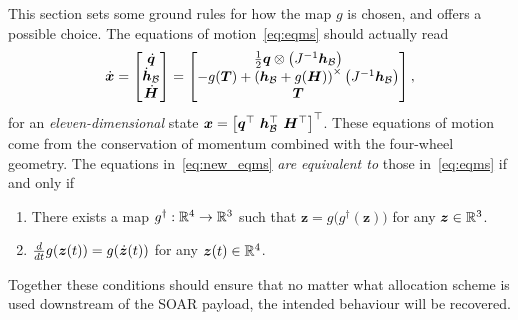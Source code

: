 \documentclass[10pt]{article}
\begin{document}
This section sets some ground rules for how the map $g$ is chosen, and offers a possible choice. The equations of motion~\eqref{eq:eqms} should actually read 
\begin{equation}
\dot{\bm{x}} = \begin{bmatrix}
\dot{\bm{q}} \\ \dot{\bm{h}}_{\mathcal{B}} \\ \dot{\bm{H}}
\end{bmatrix} = \begin{bmatrix}
\tfrac{1}{2} \bm{q} \otimes \left(J^{-1} \bm{h}_{\mathcal{B}} \right) \\
-g(\bm{T}) + \left( \bm{h}_{\mathcal{B}} + g(\bm{H}) \right)^{\times} \left( J^{-1} \bm{h}_{\mathcal{B}} \right) \\
\bm{T}
\end{bmatrix},
\label{eq:new_eqms}
\end{equation}
for an \textit{eleven-dimensional} state $\bm{x} = \left[ \q\tran \ \hB\tran \ \bm{H}\tran \right]\tran$. These equations of motion come from the conservation of momentum combined with the four-wheel geometry. The equations in~\eqref{eq:new_eqms} \textit{are equivalent to} those in~\eqref{eq:eqms} if and only if
\begin{enumerate}
\item There exists a map $g^{\dagger} : {\mathbb{R}}^4 \rightarrow {\mathbb{R}}^3$ such that $\bm{z} = g\big( g^{\dagger}(\bm{z})\big)$ for any $\bm{z}\in{\mathbb{R}}^3$. 
\item $\frac{d }{d t}g(\bm{z}(t)) = g(\dot{\bm{z}}(t))$ for any $\bm{z}(t)\in{\mathbb{R}}^4$.
\end{enumerate}
Together these conditions should ensure that no matter what allocation scheme is used downstream of the SOAR payload, the intended behaviour will be recovered. 
\end{document}
